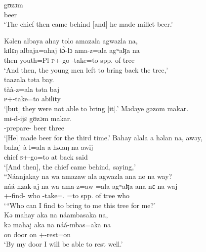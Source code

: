  \medskip
 \gll gʊzɔm\\
      beer \\
 \glt ‘The chief then came behind [and] he made millet beer.’
 \z
 
\ea  Kəlen  albaya  ahay  tolo  amazala  agwazla  na,\\
 \gll kɪlɛŋ  albaja=ahaj    t\`ɔ-lɔ      ama-z=ala   agʷaɮa  na\\
 then   youth=Pl      \textsc{p}+{\PFV}-go   {\DEP}-take=to  {spp. of tree}  {\PSP}\\
 \glt ‘And then, the young men left to bring back the tree,’\\
 
 \medskip
  taazala təta  bay.\\
 \gll tàà-z=ala  təta baj\\
 \textsc{p}+{\HOR}-take=to      ability  {\NEG}\\
 \glt ‘[but] they were not able to bring [it].’  
 \z
\ea   Mədəye  gəzom  makar.  \\
 \gll mɪ-d-ijɛ      gʊzɔm     makar. \\
 {\NOM}{}-prepare{}-{\CL}       beer  three\\
 \glt ‘[He] made beer for the third time.’
 \z
\ea   Bahay  alala  a  həlan  na,  awəy,\\
 \gll bahaj    à-l=ala      a   həlaŋ   na awij\\
 chief   \textsc{s}+{\PFV}-go=to   at   back   {\PSP}  said  \\  
 \glt ‘[And then], the chief came behind, saying,’\\
 
 \medskip
  “Náanjakay  na  wa  amazaw  ala  agwazla  ana  ne  na  way?\\
 \gll náá-nzak-aj        na       wa  ama-z=aw =ala      agʷaɮa    ana     nɛ   na  waj\\
 {\oneS}+\textsc{{\POT}}{}-find{}-{\CL}   {\PSP}   who   {\DEP}-take={\oneS}.{\IO}  =to    {spp. of tree}     {\DAT}    {\oneS}    {\PSP}  who\\
 \glt ‘“Who can I find to bring to me this tree for me?’\\
 
 \medskip
 Kə  mahay  aka  na  náambasaka  na,\\
\gll  kə   mahaj    aka  na   náá-mbas=aka   na\\
 on    door       on      {\PSP}   {\oneS}+{\POT}-rest=on      {\PSP}\\
 \glt ‘By my door I will be able to rest well.’\\

